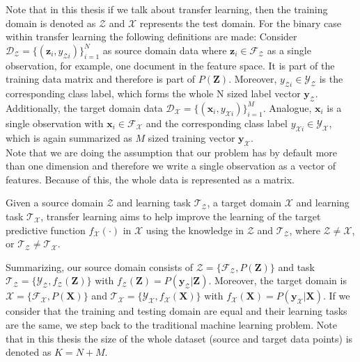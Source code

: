 Note that in this thesis if we talk about transfer learning, then the training domain is denoted as $\mathcal{Z}$ and $\mathcal{X}$ represents the test domain.
For the binary case within transfer learning the following definitions are made:
Consider $\mathcal{D_Z} = \{(\mathbf{z}_i,y_{\mathcal{Z}i})\}_{i=1}^{N}$ as source domain data where $\mathbf{z}_i \in \mathcal{F}_\mathcal{Z}$ as a single observation, for example, one document in the feature space. It is part of the training data matrix and therefore is part of $P(\mathbf{Z})$.
Moreover, $y_{\mathcal{Z}i} \in \mathcal{Y}_\mathcal{Z}$ is the corresponding class label, which forms the whole N sized label vector $\mathbf{y}_\mathcal{Z}$.
Additionally, the target domain data $\mathcal{D_X} = \{(\mathbf{x}_i,y_{\mathcal{X}i})\}_{i=1}^{M}$.
Analogue, $\mathbf{x}_i$ is a single observation with $\mathbf{x}_i \in \mathcal{F}_\mathcal{X}$ and the corresponding class label $y_{\mathcal{X}i} \in \mathcal{Y}_\mathcal{X}$, which is again summarized as $M$ sized training vector $\mathbf{y}_\mathcal{X}$.\cite[p. 2]{Aggarwal.2015}\\
Note that we are doing the assumption that our problem has by default more than one dimension and therefore we write a single observation as a vector of features.
Because of this, the whole data is represented as a matrix.
\begin{mDef}\label{DefTl}
	Given a source domain $\mathcal{Z}$ and learning task $\mathcal{T}_\mathcal{Z}$, a target domain $\mathcal{X}$ and learning task $\mathcal{T}_\mathcal{X}$, transfer learning aims to help improve the learning of the target predictive function $f_\mathcal{X}(\cdot)$ in $\mathcal{X}$ using the knowledge in $\mathcal{Z}$ and $\mathcal{T}_\mathcal{Z}$, where $\mathcal{Z} \neq \mathcal{X}$, or $\mathcal{T}_\mathcal{Z} \neq \mathcal{T}_\mathcal{X}$.\cite[p. 542]{Aggarwal.2015}	
\end{mDef}
Summarizing, our source domain consists of $\mathcal{Z}=\{\mathcal{F}_\mathcal{Z},P(\mathbf{Z})\}$ and task $\mathcal{T_Z}=\{\mathcal{Y_Z},f_\mathcal{Z}(\mathbf{Z})\}$ with $f_\mathcal{Z}(\mathbf{Z}) = P(\mathbf{y}_\mathcal{Z}|\mathbf{Z})$. Moreover, the target domain is  $\mathcal{X}=\{\mathcal{F}_\mathcal{X},P(\mathbf{X})\}$ and $\mathcal{T_X}=\{\mathcal{Y_X},f_\mathcal{X}(\mathbf{X})\}$ with $f_\mathcal{X}(\mathbf{X}) = P(\mathbf{y}_\mathcal{X}|\mathbf{X})$. 
If we consider that the training and testing domain are equal and their learning tasks are the same, we step back to the traditional machine learning problem.
Note that in this thesis the size of the whole dataset (source and target data points) is denoted as $K=N+M$.
